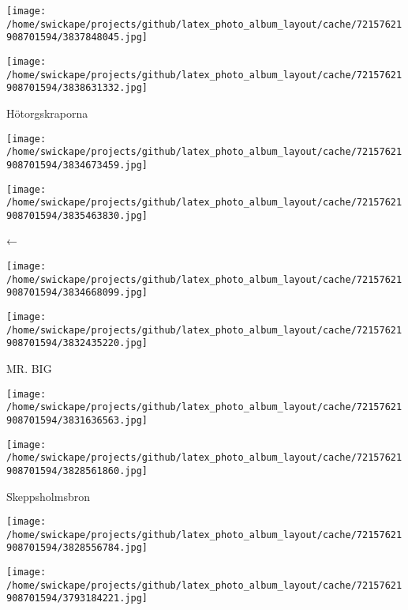\documentclass[10pt,letterpaper]{article}
\begin{document}
\pagebreak

\texttt{[image: /home/swickape/projects/github/latex\_photo\_album\_layout/cache/72157621908701594/3837848045.jpg]}

\vspace{0.25in}
\texttt{[image: /home/swickape/projects/github/latex\_photo\_album\_layout/cache/72157621908701594/3838631332.jpg]}


Hötorgskraporna
\pagebreak

\texttt{[image: /home/swickape/projects/github/latex\_photo\_album\_layout/cache/72157621908701594/3834673459.jpg]}

\vspace{0.25in}
\texttt{[image: /home/swickape/projects/github/latex\_photo\_album\_layout/cache/72157621908701594/3835463830.jpg]}

←\\

\pagebreak

\texttt{[image: /home/swickape/projects/github/latex\_photo\_album\_layout/cache/72157621908701594/3834668099.jpg]}

\vspace{0.25in}
\texttt{[image: /home/swickape/projects/github/latex\_photo\_album\_layout/cache/72157621908701594/3832435220.jpg]}

MR. BIG\\

\pagebreak

\texttt{[image: /home/swickape/projects/github/latex\_photo\_album\_layout/cache/72157621908701594/3831636563.jpg]}

\vspace{0.25in}
\texttt{[image: /home/swickape/projects/github/latex\_photo\_album\_layout/cache/72157621908701594/3828561860.jpg]}


Skeppsholmsbron
\pagebreak

\texttt{[image: /home/swickape/projects/github/latex\_photo\_album\_layout/cache/72157621908701594/3828556784.jpg]}

\vspace{0.25in}
\texttt{[image: /home/swickape/projects/github/latex\_photo\_album\_layout/cache/72157621908701594/3793184221.jpg]}
\end{document}
